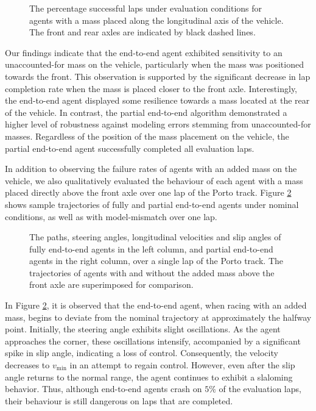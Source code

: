 \begin{figure}[htb!]
    \centering
    
    \caption[Percentage successful laps under evaluation conditions for agents with a mass placed along the longitudinal axis of the vehicle]{The percentage successful laps under evaluation conditions for agents with a mass placed along the longitudinal axis of the vehicle. The front and rear axles are indicated by black dashed lines.}
    \label{fig:unknown_mass}
\end{figure}

Our findings indicate that the end-to-end agent exhibited sensitivity to an unaccounted-for mass on the vehicle, particularly when the mass was positioned towards the front. 
This observation is supported by the significant decrease in lap completion rate when the mass is placed closer to the front axle. 
Interestingly, the end-to-end agent displayed some resilience towards a mass located at the rear of the vehicle. 
In contrast, the partial end-to-end algorithm demonstrated a higher level of robustness against modeling errors stemming from unaccounted-for masses. 
Regardless of the position of the mass placement on the vehicle, the partial end-to-end agent successfully completed all evaluation laps.

In addition to observing the failure rates of agents with an added mass on the vehicle, we also qualitatively evaluated the behaviour of each agent with a mass placed directly above the front axle over one lap of the Porto track.
Figure \ref{fig:unknown_mass_trajs_2} shows sample trajectories of fully and partial end-to-end agents under nominal conditions, as well as with model-mismatch over one lap.


\begin{figure}[htb!]
    \centering
    
    \caption[Trajectories of agents racing with and without an accounted for mass placed above the front axle]{The paths, steering angles, longitudinal velocities and slip angles of fully end-to-end agents in the left column, and partial end-to-end agents in the right column, over a single lap of the Porto track. The trajectories of agents with and without the added mass above the front axle are superimposed for comparison.}
    \label{fig:unknown_mass_trajs_2}
\end{figure}

In Figure \ref{fig:unknown_mass_trajs_2}, it is observed that the end-to-end agent, when racing with an added mass, begins to deviate from the nominal trajectory at approximately the halfway point. 
Initially, the steering angle exhibits slight oscillations. 
As the agent approaches the corner, these oscillations intensify, accompanied by a significant spike in slip angle, indicating a loss of control. 
Consequently, the velocity decreases to $v_{\text{min}}$ in an attempt to regain control. 
However, even after the slip angle returns to the normal range, the agent continues to exhibit a slaloming behavior.
Thus, although end-to-end agents crash on $5\%$ of the evaluation laps, their behaviour is still dangerous on laps that are completed.

